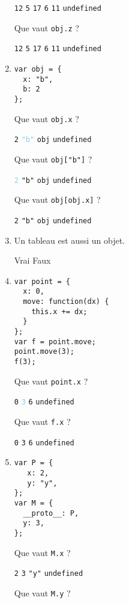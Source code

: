 \documentclass[a4paper, 12pt]{article}
\newcommand{\fullpoint}[1]{\textcolor{RubineRed}{#1}}
\newcommand{\halfpoint}[1]{\textcolor{SkyBlue}{#1}}
\newcommand{\choice}[1]{\Square\hspace{2pt} #1\hspace{5pt}}
\newcommand{\choiceg}[1]{\fullpoint{\XBox\hspace{2pt} #1\hspace{5pt}}}
\newcommand{\choicec}[1]{\Square\hspace{2pt} \lstinline{#1}\hspace{5pt}}
\newcommand{\choicecg}[1]{\fullpoint{\XBox\hspace{2pt} \lstinline{#1}\hspace{5pt}}}
\newcommand{\choicecgh}[1]{\halfpoint{\XBox\hspace{2pt} \lstinline{#1}\hspace{5pt}}}
\begin{document}
\begin{enumerate}
  \choicec{12} \choicec{5} \choicec{17} \choicec{6} \choicecg{11} \choicec{undefined}

  Que vaut \lstinline{obj.z} ?

  \choicec{12} \choicec{5} \choicec{17} \choicec{6} \choicec{11} \choicecg{undefined}
\item \lstset{language=javascript}
\begin{lstlisting}
var obj = {
  x: "b",
  b: 2
};
\end{lstlisting}

  Que vaut \lstinline{obj.x} ?

  \choicec{2} \choicecgh{"b"} \choicec{obj} \choicec{undefined}

  Que vaut \lstinline{obj["b"]} ?

  \choicecgh{2} \choicec{"b"} \choicec{obj} \choicec{undefined}

  Que vaut \lstinline{obj[obj.x]} ?

  \choicecg{2} \choicec{"b"} \choicec{obj} \choicec{undefined}
\item Un tableau est aussi un objet.

   \choiceg{Vrai} \choice{Faux}
\item \lstset{language=javascript}
\begin{lstlisting}
var point = {
  x: 0,
  move: function(dx) {
    this.x += dx;
  }
};
var f = point.move;
point.move(3);
f(3);
\end{lstlisting}



  Que vaut \lstinline{point.x} ?

  \choicec{0} \choicecgh{3} \choicec{6} \choicec{undefined}

  Que vaut \lstinline{f.x} ?

  \choicec{0} \choicec{3} \choicec{6} \choicecg{undefined}
\item \lstset{language=javascript}
\begin{lstlisting}
var P = {
   x: 2,
   y: "y",
};
var M = {
  __proto__: P,
  y: 3,
};
\end{lstlisting}

  Que vaut \lstinline{M.x} ?

  \choicecg{2} \choicec{3} \choicec{"y"} \choicec{undefined}

  Que vaut \lstinline{M.y} ?


\end{enumerate}
\end{document}
